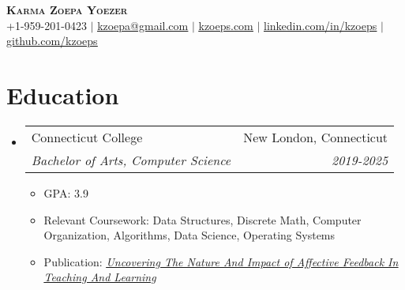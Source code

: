 \documentclass[letterpaper,11pt]{article}
\makeatletter
\newcommand{\resumeItem}[1]{
  \item\small{
    {#1 \vspace{-2pt}}
  }
}
\newcommand{\resumeSubheading}[4]{
  \vspace{-2pt}\item
    \begin{tabular*}{0.97\textwidth}[t]{l@{\extracolsep{\fill}}r}
      {#1} & #2 \\
      \textit{\small#3} & \textit{\small #4} \\
    \end{tabular*}\vspace{-7pt}
}
\newcommand{\resumeSubHeadingListStart}{\begin{itemize}[leftmargin=0.15in, label={}]}
\newcommand{\resumeSubHeadingListEnd}{\end{itemize}}
\newcommand{\resumeItemListStart}{\begin{itemize}}
\newcommand{\resumeItemListEnd}{\end{itemize}\vspace{-5pt}}
\makeatother
\begin{document}


\begin{center}
    \textbf{\Huge \scshape Karma Zoepa Yoezer} \\ \vspace{1pt}
    \small +1-959-201-0423 $|$ \href{mailto:kzoepa@gmailcom}{\underline{kzoepa@gmail.com}} $|$ \href{https://kzoeps.com}{\underline{kzoeps.com}} $|$ 
    \href{https://linkedin.com/in/kzoeps}{\underline{linkedin.com/in/kzoeps}} $|$
    \href{https://github.com/kzoeps}{\underline{github.com/kzoeps}}
\end{center}

%

\section{Education}
  \resumeSubHeadingListStart
    \resumeSubheading
      {Connecticut College}{New London, Connecticut}
      {Bachelor of Arts, Computer Science}{2019-2025}
          \resumeItemListStart
            \resumeItem{GPA: 3.9}
            \resumeItem{Relevant Coursework: Data Structures, Discrete Math, Computer Organization, Algorithms, Data Science, Operating Systems}
            \resumeItem{Publication: \href{https://library.iated.org/view/TARIMO2020UNC}{   \emph{
                \underline{Uncovering The Nature And Impact of Affective Feedback In  Teaching And Learning}
                }
            }
        }
            
        \resumeItemListEnd

  \resumeSubHeadingListEnd

\end{document}
